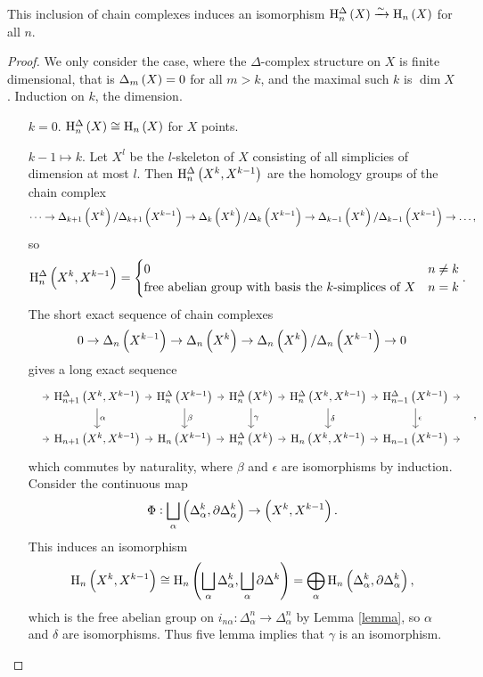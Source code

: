 \begin{theorem}
This inclusion of chain complexes induces an isomorphism $ \H_n^\Delta\br{X} \xrightarrow{\sim} \H_n\br{X} $ for all $ n $.
\end{theorem}

\begin{proof}
We only consider the case, where the $ \Delta $-complex structure on $ X $ is finite dimensional, that is $ \Delta_m\br{X} = 0 $ for all $ m > k $, and the maximal such $ k $ is $ \dim X $. Induction on $ k $, the dimension.
\begin{itemize}[leftmargin=2cm]
\item[$ k = 0 $.] $ \H_n^\Delta\br{X} \cong \H_n\br{X} $ for $ X $ points.
\item[$ k - 1 \mapsto k $.] Let $ X^l $ be the $ l $-skeleton of $ X $ consisting of all simplicies of dimension at most $ l $. Then $ \H_n^\Delta\br{X^k, X^{k - 1}} $ are the homology groups of the chain complex
$$ \dots \to \Delta_{k + 1}\br{X^k} / \Delta_{k + 1}\br{X^{k - 1}} \to \Delta_k\br{X^k} / \Delta_k\br{X^{k - 1}} \to \Delta_{k - 1}\br{X^k} / \Delta_{k - 1}\br{X^{k - 1}} \to \dots, $$
so
$$ \H_n^\Delta\br{X^k, X^{k - 1}} =
\begin{cases}
0 & n \ne k \\
\text{free abelian group with basis the $ k $-simplices of} \ X & n = k
\end{cases}.
$$
The short exact sequence of chain complexes
$$ 0 \to \Delta_n\br{X^{k - 1}} \to \Delta_n\br{X^k} \to \Delta_n\br{X^k} / \Delta_n\br{X^{k - 1}} \to 0 $$
gives a long exact sequence
$$
\begin{tikzcd}[column sep=tiny]
\ \arrow{r} & \H_{n + 1}^\Delta\br{X^k, X^{k - 1}} \arrow{r} \arrow{d}{\alpha} & \H_n^\Delta\br{X^{k - 1}} \arrow{r} \arrow{d}{\beta} & \H_n^\Delta\br{X^k} \arrow{r} \arrow{d}{\gamma} & \H_n^\Delta\br{X^k, X^{k - 1}} \arrow{r} \arrow{d}{\delta} & \H_{n - 1}^\Delta\br{X^{k - 1}} \arrow{d}{\epsilon} \arrow{r} & \ \\
\ \arrow{r} & \H_{n + 1}\br{X^k, X^{k - 1}} \arrow{r} & \H_n\br{X^{k - 1}} \arrow{r} & \H_n^\Delta\br{X^k} \arrow{r} & \H_n\br{X^k, X^{k - 1}} \arrow{r} & \H_{n - 1}\br{X^{k - 1}} \arrow{r} & \
\end{tikzcd},
$$
which commutes by naturality, where $ \beta $ and $ \epsilon $ are isomorphisms by induction. Consider the continuous map
$$ \Phi : \bigsqcup_\alpha \br{\Delta_\alpha^k, \da\Delta_\alpha^k} \to \br{X^k, X^{k - 1}}. $$
This induces an isomorphism
$$ \H_n\br{X^k, X^{k - 1}} \cong \H_n\br{\bigsqcup_\alpha \Delta_\alpha^k, \bigsqcup_\alpha \da\Delta^k} = \bigoplus_\alpha \H_n\br{\Delta_\alpha^k, \da\Delta_\alpha^k}, $$
which is the free abelian group on $ i_{n\alpha} : \Delta_\alpha^n \to \Delta_\alpha^n $ by Lemma \ref{lemma}, so $ \alpha $ and $ \delta $ are isomorphisms. Thus five lemma implies that $ \gamma $ is an isomorphism.
\end{itemize}
\end{proof}


